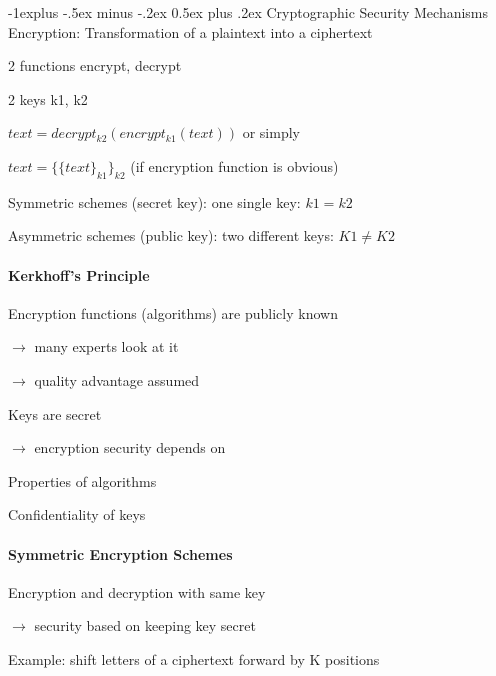 \documentclass[a4paper]{article}
\makeatletter
\renewcommand{\subsection}{\@startsection{subsection}{2}{0mm}%
                {-1explus -.5ex minus -.2ex}%
                {0.5ex plus .2ex}%
                {\normalfont\normalsize\bfseries}}
\makeatother
\begin{document}
\begin{multicols}{3}
    \subsection{Cryptographic Security Mechanisms}
    Encryption: Transformation of a plaintext into a ciphertext
    \begin{itemize*}
        \item 2 functions encrypt, decrypt
        \item 2 keys k1, k2
        \item $text = decrypt_{k2}(encrypt_{k1}(text))$ or simply
        \item $text = \{\{text\}_{k1}\}_{k2}$ (if encryption function is obvious)
        \item Symmetric schemes (secret key): one single key: $k1=k2$
        \item Asymmetric schemes (public key): two different keys: $K1\not=K2$
    \end{itemize*}

    \paragraph{Kerkhoff’s Principle}
    \begin{enumerate*}
        \item Encryption functions (algorithms) are publicly known
        \begin{itemize*}
            \item[$\rightarrow$] many experts look at it
            \item[$\rightarrow$] quality advantage assumed
        \end{itemize*}
        \item Keys are secret
        \begin{itemize*}
            \item[$\rightarrow$] encryption security depends on
            \item Properties of algorithms
            \item Confidentiality of keys
        \end{itemize*}
    \end{enumerate*}

    \paragraph{Symmetric Encryption Schemes}
    \begin{itemize*}
        \item Encryption and decryption with same key
        \item[$\rightarrow$] security based on keeping key secret
        \item Example: shift letters of a ciphertext forward by K positions
    \end{itemize*}


\end{multicols}
\end{document}
